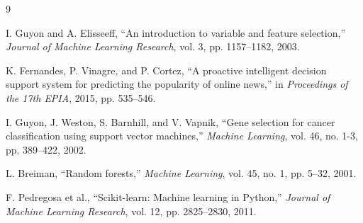 \documentclass[conference]{IEEEtran}
\begin{document}
\begin{thebibliography}{9}

I. Guyon and A. Elisseeff, ``An introduction to variable and feature selection,'' \textit{Journal of Machine Learning Research}, vol. 3, pp. 1157--1182, 2003.

K. Fernandes, P. Vinagre, and P. Cortez, ``A proactive intelligent decision support system for predicting the popularity of online news,'' in \textit{Proceedings of the 17th EPIA}, 2015, pp. 535--546.

I. Guyon, J. Weston, S. Barnhill, and V. Vapnik, ``Gene selection for cancer classification using support vector machines,'' \textit{Machine Learning}, vol. 46, no. 1-3, pp. 389--422, 2002.

L. Breiman, ``Random forests,'' \textit{Machine Learning}, vol. 45, no. 1, pp. 5--32, 2001.

F. Pedregosa et al., ``Scikit-learn: Machine learning in Python,'' \textit{Journal of Machine Learning Research}, vol. 12, pp. 2825--2830, 2011.

\end{thebibliography}
\end{document}
